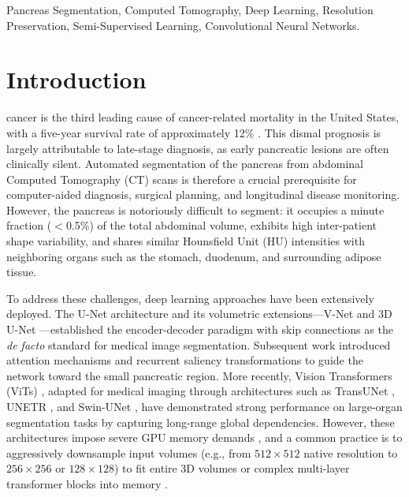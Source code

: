\documentclass[journal, twocolumn]{IEEEtran}
\begin{document}
\begin{IEEEkeywords}
Pancreas Segmentation, Computed Tomography, Deep Learning, Resolution Preservation, Semi-Supervised Learning, Convolutional Neural Networks.
\end{IEEEkeywords}

\section{Introduction}
 cancer is the third leading cause of cancer-related mortality in the United States, with a five-year survival rate of approximately 12\% \cite{Cancerstatistics2023}. This dismal prognosis is largely attributable to late-stage diagnosis, as early pancreatic lesions are often clinically silent. Automated segmentation of the pancreas from abdominal Computed Tomography (CT) scans is therefore a crucial prerequisite for computer-aided diagnosis, surgical planning, and longitudinal disease monitoring. However, the pancreas is notoriously difficult to segment: it occupies a minute fraction ($<$0.5\%) of the total abdominal volume, exhibits high inter-patient shape variability, and shares similar Hounsfield Unit (HU) intensities with neighboring organs such as the stomach, duodenum, and surrounding adipose tissue.

To address these challenges, deep learning approaches have been extensively deployed. The U-Net architecture \cite{unet} and its volumetric extensions---V-Net \cite{vnet} and 3D U-Net \cite{cciccek20163d}---established the encoder-decoder paradigm with skip connections as the \textit{de facto} standard for medical image segmentation. Subsequent work introduced attention mechanisms \cite{attunet} and recurrent saliency transformations \cite{rstn} to guide the network toward the small pancreatic region. More recently, Vision Transformers (ViTs) \cite{dosovitskiy2020image}, adapted for medical imaging through architectures such as TransUNet \cite{transunet}, UNETR \cite{unetr_ref}, and Swin-UNet \cite{swinunet}, have demonstrated strong performance on large-organ segmentation tasks by capturing long-range global dependencies. However, these architectures impose severe GPU memory demands \cite{swin_teaching}, and a common practice is to aggressively downsample input volumes (e.g., from $512 \times 512$ native resolution to $256 \times 256$ or $128 \times 128$) to fit entire 3D volumes or complex multi-layer transformer blocks into memory \cite{bessl}.
\end{document}
